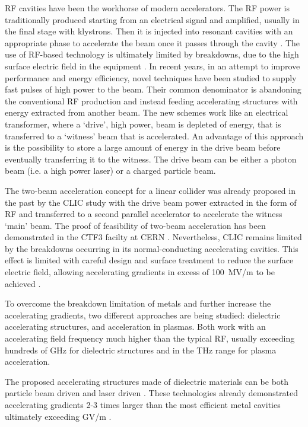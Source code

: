 RF cavities have been the workhorse of modern accelerators. The RF power is traditionally produced starting from an electrical signal and amplified, usually in the final stage with klystrons. Then it is injected into resonant cavities with an appropriate phase to accelerate the beam once it passes through the cavity \cite{Wangler:book}. The use of RF-based technology is ultimately limited by breakdowns, due to the high surface electric field in the equipment \cite{KilpLimit}. In recent years, in an attempt to improve performance and energy efficiency, novel techniques have been studied to supply fast pulses of high power to the beam. Their common denominator is abandoning the conventional RF production and instead feeding accelerating structures with energy extracted from another beam. The new schemes work like an electrical transformer, where a `drive', high power, beam is depleted of energy, that is transferred to a `witness' beam that is accelerated. An advantage of this approach is the possibility to store a large amount of energy in the drive beam before eventually transferring it to the witness. The drive beam can be either a photon beam (i.e. a high power laser) or a charged particle beam. 

The two-beam acceleration concept for a linear collider was already proposed in the past by the CLIC study \cite{HOPKINS198415} with the drive beam power extracted in the form of RF and transferred to a second parallel accelerator to accelerate the witness `main' beam. The proof of feasibility of two-beam acceleration has been demonstrated in the CTF3 facilty at CERN \cite{Corsini:2017use}. Nevertheless, CLIC remains limited by the breakdowns occurring in its normal-conducting accelerating cavities. This effect is limited with careful design and surface treatment to reduce the surface electric field, allowing accelerating gradients in excess of 100~MV/m to be achieved \cite{PhysRevAccelBeams.21.061001, PhysRevAccelBeams.21.102002}. 

To overcome the breakdown limitation of metals and further increase the accelerating gradients, two different approaches are being studied: dielectric accelerating structures, and acceleration in plasmas. Both work with an accelerating field frequency much higher than the typical RF, usually exceeding hundreds of GHz for dielectric structures and in the THz range for plasma acceleration. 

The proposed accelerating structures made of dielectric materials can be both particle beam driven \cite{DWA_1} and laser driven \cite{RevModPhys.86.1337}. These technologies already demonstrated accelerating gradients 2-3 times larger than the most efficient metal cavities \cite{Peralta:2013vpa} ultimately exceeding GV/m \cite{DWA_2}.

